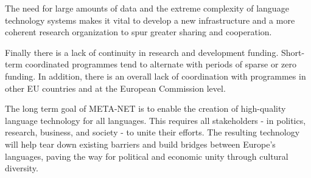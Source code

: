 \documentclass[]{../metanetpaper}
\begin{document}
\begin{multicols}{2}
The need for large amounts of data and the extreme complexity of language technology systems makes it vital to develop a new infrastructure and a more coherent research organization to spur greater sharing and cooperation.

Finally there is a lack of continuity in research and development funding. Short-term coordinated programmes tend to alternate with periods of sparse or zero funding. In addition, there is an overall lack of coordination with programmes in other EU countries and at the European Commission level.

The long term goal of META-NET is to enable the creation of high-quality language technology for all languages. This requires all stakeholders - in politics, research, business, and society - to unite their efforts. The resulting technology will help tear down existing barriers and build bridges between Europe’s languages, paving the way for political and economic unity through cultural diversity. 
\end{multicols}

\clearpage

\end{document}
